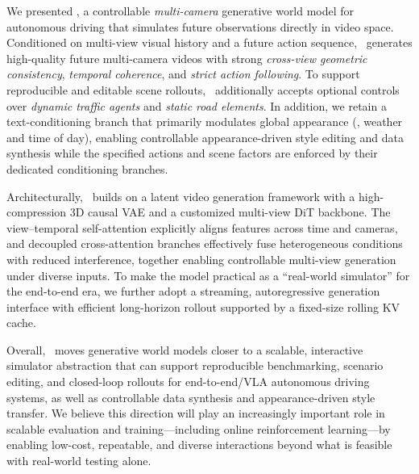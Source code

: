 \label{sec:conclusion}

We presented \modelname, a controllable \emph{multi-camera} generative world model for autonomous driving that simulates future observations directly in video space. Conditioned on multi-view visual history and a future action sequence, \modelname~generates high-quality future multi-camera videos with strong \emph{cross-view geometric consistency}, \emph{temporal coherence}, and \emph{strict action following}. To support reproducible and editable scene rollouts, \modelname~additionally accepts optional controls over \emph{dynamic traffic agents} and \emph{static road elements}. In addition, we retain a text-conditioning branch that primarily modulates global appearance (\eg, weather and time of day), enabling controllable appearance-driven style editing and data synthesis while the specified actions and scene factors are enforced by their dedicated conditioning branches.

Architecturally, \modelname~builds on a latent video generation framework with a high-compression 3D causal VAE and a customized multi-view DiT backbone. The view--temporal self-attention explicitly aligns features across time and cameras, and decoupled cross-attention branches effectively fuse heterogeneous conditions with reduced interference, together enabling controllable multi-view generation under diverse inputs. To make the model practical as a ``real-world simulator'' for the end-to-end era, we further adopt a streaming, autoregressive generation interface with efficient long-horizon rollout supported by a fixed-size rolling KV cache.

Overall, \modelname~moves generative world models closer to a scalable, interactive simulator abstraction that can support reproducible benchmarking, scenario editing, and closed-loop rollouts for end-to-end/VLA autonomous driving systems, as well as controllable data synthesis and appearance-driven style transfer. We believe this direction will play an increasingly important role in scalable evaluation and training---including online reinforcement learning---by enabling low-cost, repeatable, and diverse interactions beyond what is feasible with real-world testing alone.